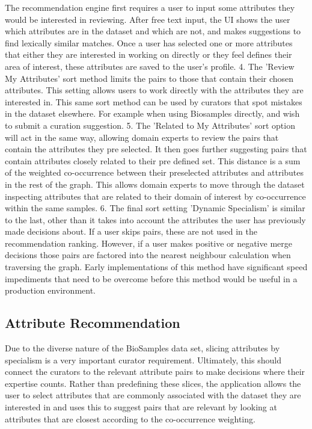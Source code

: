 \documentclass{bmcart}
\begin{document}
The recommendation engine first requires a user to input some attributes they would be interested in reviewing. After free text input, the UI shows the user which attributes are in the dataset and which are not, and makes suggestions to find lexically similar matches. Once a user has selected one or more attributes that either they are interested in working on directly or they feel defines their area of interest, these attributes are saved to the user's profile. 4. The 'Review My Attributes' sort method limits the pairs to those that contain their chosen attributes. This setting allows users to work directly with the attributes they are interested in. This same sort method can be used by curators that spot mistakes in the dataset elsewhere. For example when using Biosamples directly, and wish to submit a curation suggestion. 5. The 'Related to My Attributes' sort option will act in the same way, allowing domain experts to review the pairs that contain the attributes they pre selected. It then goes further suggesting pairs that contain attributes closely related to their pre defined set. This distance is a sum of the weighted co-occurrence between their preselected attributes and attributes in the rest of the graph. This allows domain experts to move through the dataset inspecting attributes that are related to their domain of interest by co-occurrence within the same samples. 6. The final sort setting 'Dynamic Specialism' is similar to the last, other than it takes into account the attributes the user has previously made decisions about. If a user skips pairs, these are not used in the recommendation ranking. However, if a user makes positive or negative merge decisions those pairs are factored into the nearest neighbour calculation when traversing the graph. Early implementations of this method have significant speed impediments that need to be overcome before this method would be useful in a production environment.

\subsection*{Attribute Recommendation}

Due to the diverse nature of the BioSamples data set, slicing attributes by specialism is a very important curator requirement. Ultimately, this should connect the curators to the relevant attribute pairs to make decisions where their expertise counts. Rather than predefining these slices, the application allows the user to select attributes that are commonly associated with the dataset they are interested in and uses this to suggest pairs that are relevant by looking at attributes that are closest according to the co-occurrence weighting.
\end{document}
